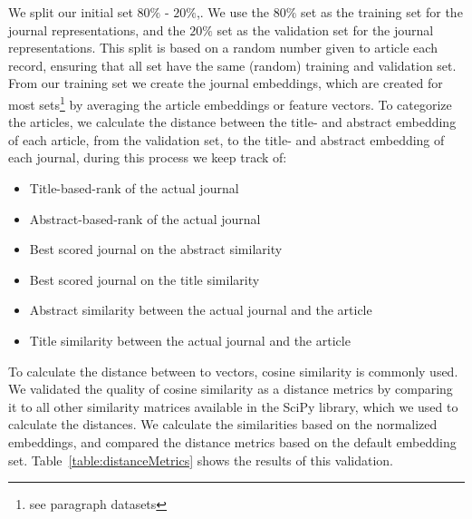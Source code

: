 \documentclass[../../Thesis.tex]{subfiles}
\begin{document}
We split our initial set  $80\%$ - $20\%$,. We use the $80\%$ set as the training set for the journal representations, and the $20\%$ set as the validation set for the journal representations. This split is based on a random number given to article each record, ensuring that all set have the same (random) training and validation set.
From our training set we create the journal embeddings, which are created for most sets\footnote{see paragraph datasets} by averaging the article embeddings or feature vectors.
To categorize the articles, we calculate the distance between the title- and abstract embedding of each article, from the validation set, to the title- and abstract embedding of each journal, during this process we keep track of:
\begin{itemize}
\item{Title-based-rank of the actual journal}
\item{Abstract-based-rank of the actual journal}
\item{Best scored journal on the abstract similarity}
\item{Best scored journal on the title similarity}
\item{Abstract similarity between the actual journal and the article}
\item{Title similarity between the actual journal and the article}
\end{itemize}
To calculate the distance between to vectors, cosine similarity is commonly used. We validated the quality of cosine similarity as a distance metrics by comparing it to all other similarity matrices available in the SciPy library, which we used to calculate the distances. We calculate the similarities based on the normalized embeddings, and compared the distance metrics based on the default embedding set. Table~\ref{table:distanceMetrics} shows the results of this validation.\\
\end{document}
